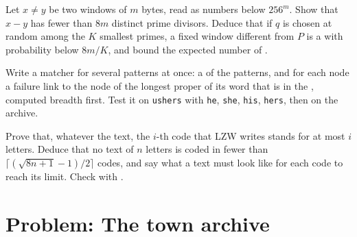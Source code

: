 \begin{exercise}[$\star\star\star$]\label{exo:b2:text-algorithms:10}
Let $x \neq y$ be two windows of $m$ bytes, read as numbers below $256^m$. Show that $x - y$ has fewer than $8m$
distinct prime divisors. Deduce that if $q$ is chosen at random among the $K$ smallest primes, a fixed window different
from $P$ is a  with probability below $8m/K$, and bound the expected number of .
\end{exercise}

\begin{exercise}[$\star\star\star$]\label{exo:b2:text-algorithms:11}
Write a matcher for several patterns at once: a  of the patterns, and for each node a failure link to the node of
the longest proper  of its word that is in the , computed breadth first. Test it on \texttt{ushers} with
\texttt{he}, \texttt{she}, \texttt{his}, \texttt{hers}, then on the archive.
\end{exercise}

\begin{exercise}[$\star\star\star$]\label{exo:b2:text-algorithms:12}
Prove that, whatever the text, the $i$-th code that LZW writes stands for at most $i$ letters. Deduce that no text of
$n$ letters is coded in fewer than $\lceil (\sqrt{8n+1}-1)/2 \rceil$ codes, and say what a text must look like for
each code to reach its limit. Check with .
\end{exercise}

\section{Problem: The town archive}\label{sec:b2:text-algorithms:problem}

